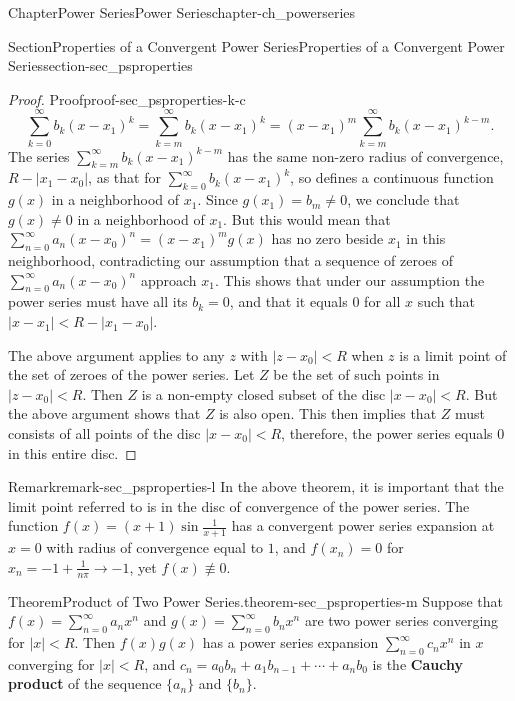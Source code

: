 \documentclass[oneside,10pt,]{book}
\newcommand{\terminology}[1]{\textbf{#1}}
\numberwithin{equation}{section}
\newcommand{\lt}{<}
\begin{document}
\begin{chapterptx}{Chapter}{Power Series}{}{Power Series}{}{}{chapter-ch_powerseries}
\begin{sectionptx}{Section}{Properties of a Convergent Power Series}{}{Properties of a Convergent Power Series}{}{}{section-sec_psproperties}
\begin{proof}{Proof}{}{proof-sec_psproperties-k-c}
\begin{equation*}
\sum_{k=0}^{\infty} b_{k}(x-x_{1})^{k}=\sum_{k=m}^{\infty} b_{k}(x-x_{1})^{k}
= (x-x_{1})^{m} \sum_{k=m}^{\infty} b_{k}(x-x_{1})^{k-m}.
\end{equation*}
The series \(\sum_{k=m}^{\infty}b_{k}(x-x_{1})^{k-m}\) has the same non-zero radius of convergence, \(R-|x_{1}-x_{0}|\), as that for \(\sum_{k=0}^{\infty} b_{k}(x-x_{1})^{k}\), so defines a continuous function \(g(x)\) in a neighborhood of \(x_{1}\). Since \(g(x_{1})=b_{m}\ne 0\), we conclude that \(g(x)\ne 0\) in a neighborhood of \(x_{1}\). But this would mean that \(\sum_{n=0}^{\infty} a_{n}(x-x_{0})^{n}=(x-x_{1})^{m}g(x)\) has no zero beside \(x_{1}\) in this neighborhood, contradicting our assumption that a sequence of zeroes of \(\sum_{n=0}^{\infty} a_{n}(x-x_{0})^{n}\) approach \(x_{1}\). This shows that under our assumption the power series must have all its \(b_{k}=0\), and that it equals \(0\) for all \(x\) such that \(|x-x_{1}|\lt R-|x_{1}-x_{0}|\).%
\par
The above argument applies to any \(z\) with \(|z-x_{0}|\lt R\) when \(z\) is a limit point of the set of zeroes of the power series. Let \(Z\) be the set of such points in \(|z-x_{0}|\lt R\). Then \(Z\) is a non-empty closed subset of the disc \(|x-x_{0}|\lt R\). But the above argument shows that \(Z\) is also open. This then implies that \(Z\) must consists of all points of the disc \(|x-x_{0}|\lt R\), therefore, the power series equals \(0\) in this entire disc.%
\end{proof}
\begin{remark}{Remark}{}{remark-sec_psproperties-l}%
In the above theorem, it is important that the limit point referred to is in the disc of convergence of the power series. The function \(f(x)=(x+1)\sin\frac{1}{x+1}\) has a convergent power series expansion at \(x=0\) with radius of convergence equal to \(1\), and \(f(x_{n})=0\) for \(x_{n}=-1+\frac{1}{n\pi}\to -1\), yet \(f(x)\not\equiv 0\).\end{remark}
\begin{theorem}{Theorem}{Product of  Two Power Series.}{}{theorem-sec_psproperties-m}%
Suppose that \(f(x)=\sum_{n=0}^{\infty} a_{n} x^{n}\) and \(g(x)=\sum_{n=0}^{\infty} b_{n} x^{n}\) are two power series converging for \(|x|\lt R\). Then \(f(x)g(x)\) has a power series expansion  \(\sum_{n=0}^{\infty} c_{n} x^{n}\) in \(x\) converging for \(|x|\lt R\), and \(c_{n}=a_{0}b_{n} + a_{1}b_{n-1}+\cdots+a_{n}b_{0}\) is the \terminology{Cauchy product} of the sequence \(\{a_{n}\}\) and \(\{b_{n}\}\).\end{theorem}

\end{sectionptx}
\end{chapterptx}
\end{document}

